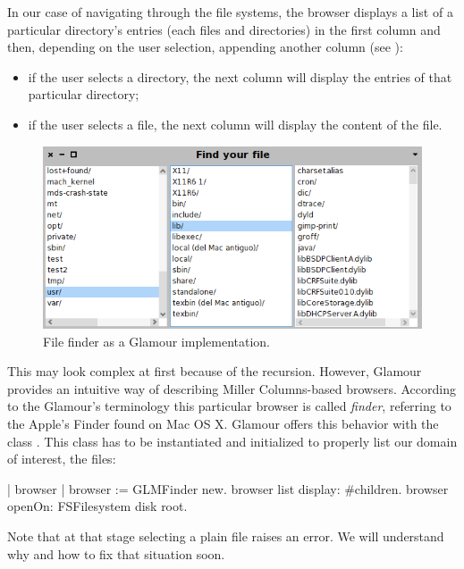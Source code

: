 \documentclass[a4paper,10pt,twoside]{book}
\begin{document}
In our case of navigating through the file systems, the browser displays a list
of a particular directory's entries (each files and directories) in
the first column and then, depending on the user selection, appending
another column (see ):

\begin{itemize}
\item if the user selects a directory, the next column will display
  the entries of that particular directory;
\item if the user selects a file, the next column will display the
  content of the file.
\end{itemize}

\begin{figure}
  \begin{center}
    \includegraphics[scale=0.48]{cs_file_finder_final}
    \caption{File finder as a Glamour
      implementation. \label{fig:casestudies/file_finder}}
  \end{center}
\end{figure}

This may look complex at first because of the recursion. However, Glamour provides an intuitive way of describing Miller Columns-based browsers. According to the Glamour's terminology this particular browser is called \emph{finder}, referring to the Apple's Finder found
on Mac OS X. 
Glamour offers this behavior with the class . This class has to be instantiated and initialized to properly list our domain of interest, the files:

\begin{code}{}
| browser |
browser := GLMFinder new.
browser list
	display: #children.
browser openOn: FSFilesystem disk root.
\end{code}

Note that at that stage selecting a plain file raises an error. We will understand why and how to fix that situation soon.
\end{document}
